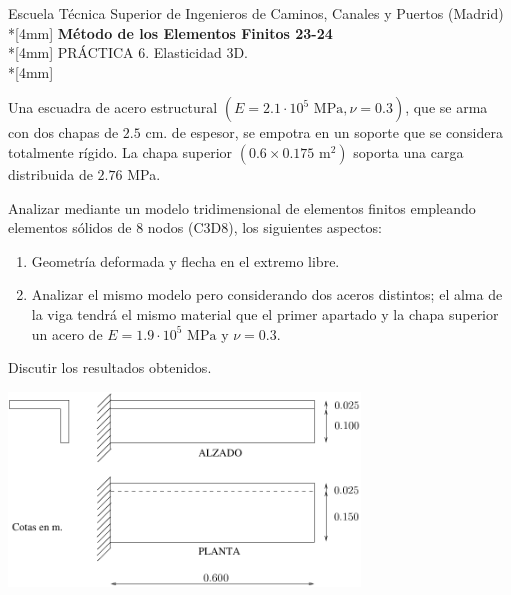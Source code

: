 \documentclass[a4paper,12pt]{article}
\begin{document}
\def\bm#1{{\mbox{\boldmath $#1$}}}
\def\eqdef{\buildrel \rm def \over =}
\def\signo{\mathop{\rm signo}\nolimits}

\mbox{}\vspace*{-20mm}

{\centering
{\small\sc Escuela Técnica Superior de Ingenieros de Caminos, Canales y Puertos (Madrid)}\\*[4mm]
{\Large\bf Método de los Elementos Finitos 23-24}\\*[4mm]
PRÁCTICA 6. Elasticidad 3D. \\*[4mm]
}



Una escuadra de acero estructural $(E=2.1 \cdot 10^{5} \textrm{ MPa},\nu=0.3)$, 
que se arma con dos 
chapas de $2.5$ cm. de 
espesor, se empotra en un soporte que se considera totalmente rígido. La
chapa superior $(0.6 \times 0.175 \textrm{ m}^2)$ soporta una carga 
distribuida de $2.76$ MPa.

Analizar mediante un modelo tridimensional de elementos finitos empleando elementos sólidos de $8$ nodos (C3D8), los siguientes aspectos:
\begin{enumerate}
	\item Geometría deformada y flecha en el extremo libre. 
	\item Analizar el mismo modelo pero considerando dos aceros distintos; el alma de la viga tendrá el mismo material que el primer apartado y la chapa superior  un acero de $E=1.9 \cdot 10^{5} \textrm{ MPa}$ y $\nu=0.3$.
\end{enumerate}
Discutir los resultados obtenidos.

\vspace{4mm}

\vspace{5mm}


\begin{center}
	\includegraphics[width=0.7\textwidth]{ejerc3}
\end{center}

\vspace{5mm}



\end{document}
